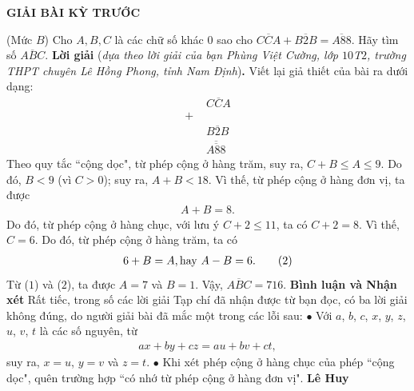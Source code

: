 	\begin{center}
		{\large{\textbf{\color{thachthuctoanhoc}GIẢI BÀI KỲ TRƯỚC}}}
	\end{center}
\begin{multicols}{2}
	\setlength{\abovedisplayskip}{4pt}
	\setlength{\belowdisplayskip}{4pt}
	{}
	(Mức $B$) Cho $A,B,C$ là các chữ số khác $0$ sao cho $\overline{CCA}+\overline{B2B}=\overline{A88}$. Hãy tìm số $\overline{ABC}$.
	\vskip 0.05cm
	\textbf{\color{thachthuctoanhoc}Lời giải} (\textit{dựa theo lời giải của bạn Phùng Việt Cường, lớp $10$T$2$, trường THPT chuyên Lê Hồng Phong, tỉnh Nam Định})\textbf{\color{thachthuctoanhoc}.}
	\vskip 0.05cm
	Viết lại giả thiết của bài ra dưới dạng:
	\begin{align*}
		&\,\,\overline{CCA}\\[-1.5ex]
		+&\\[-1ex]
		&\,\,\overline{B2B}\\[-1ex]
		&\overline{\,\,\overline{A88}\,\,}
	\end{align*}
	Theo quy tắc ``cộng dọc", từ phép cộng ở hàng trăm, suy ra, $C + B \le A \le 9$.
	\vskip 0.05cm
	Do đó, $B < 9$ (vì $C > 0$); suy ra, $A + B < 18$. Vì thế, từ phép cộng ở hàng đơn vị, ta được
	\begin{align*}
		A + B = 8. \tag{$1$}
	\end{align*}                                                                  
	Do đó, từ phép cộng ở hàng chục, với lưu ý $C + 2 \le 11$, ta có $C + 2 = 8$. Vì thế, $C = 6$. Do đó, từ phép cộng ở hàng trăm, ta có
	\begin{align*}
		6 + B = A, \text{\color{black} hay }A - B = 6. \tag{$2$}
	\end{align*}
	Từ ($1$) và ($2$), ta được $A = 7$ và $B = 1$.
	\vskip 0.05cm
	Vậy, $\overline {ABC}  = 716$.
	\vskip 0.05cm
	\textbf{\color{thachthuctoanhoc}Bình luận và Nhận xét}
	\vskip 0.05cm
	Rất tiếc, trong số các lời giải Tạp chí đã nhận được từ bạn đọc, có ba lời giải không đúng, do người giải bài đã mắc một trong các lỗi sau:
	\vskip 0.05cm
	$\bullet$  Với $a$, $b$, $c$, $x$, $y$, $z$, $u$, $v$, $t$ là các số nguyên, từ
	\begin{align*}
		ax + by + cz = au + bv + ct,
	\end{align*}
	suy ra, $x = u$, $y = v$ và $z = t$.
	\vskip 0.05cm
	$\bullet$  Khi xét phép cộng ở hàng chục của phép ``cộng dọc", quên trường hợp ``có nhớ từ phép cộng ở hàng đơn vị".
	\vskip 0.05cm
	\hfill	\textbf{\color{thachthuctoanhoc}Lê Huy}
	\vskip 0.05cm

\end{multicols}
